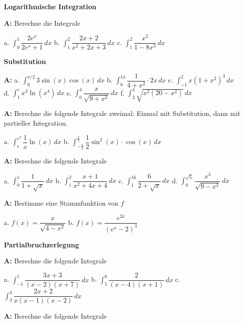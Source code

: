 \documentclass[landscape,twocolumn,a4paper]{article}
\begin{document}
\textbf{Logarithmische Integration} 
\bigskip

\textbf{A:}   
Berechne die Integrale 

a.  $\displaystyle\int_0^1 \dfrac{2e^x}{2e^x+1}  \, dx$ \quad
b.  $\displaystyle\int_1^2 \dfrac{2x+2}{x^2+2x+3} \, dx$ \quad
c.  $\displaystyle\int_1^2 \dfrac{x^2}{1-8x^3}  \, dx$ \quad
\bigskip  {}

\textbf{Substitution} 
\bigskip

\textbf{A:}   
a.  $\displaystyle\int_0^{\pi/2} 3\sin(x)\cos(x) \, dx$ \quad
b.  $\displaystyle\int_0^{14} \dfrac{1}{4+x^2}\cdot 2x \, dx$ \quad
c.  $\displaystyle\int_{-1}^2 x(1+x^2)^3  \, dx$   \\

d.  $\displaystyle\int_{1}^e x^3 \ln(x^4)  \, dx$ \quad
e.  $\displaystyle\int_0^4 \dfrac{x}{\sqrt{9+x^2}}  \, dx$ \quad
f.  $\displaystyle\int_2^4 \sqrt{x^2(20-x^2)}  \, dx$ \quad
\bigskip  {}

\textbf{A:}   
Berechne die folgende Integrale zweimal: Einmal mit Substitution, dann mit partieller Integration.

a.  $\displaystyle\int_e^{e^2} \dfrac{1}{x}\ln(x)\, dx$ \quad
b.  $\displaystyle\int_{-\frac{\pi}{2}}^{\frac{\pi}{2}} \dfrac{1}{2}\sin^2(x) \cdot \cos(x)\, dx$ \quad
\bigskip  {}

\newpage
\textbf{A:}   
Berechne die folgende Integrale 

a.  $\displaystyle\int_0^1 \dfrac{1}{1+\sqrt{x}}\, dx$ \quad
b.  $\displaystyle\int_1^2 \dfrac{x+1}{x^2+4x+4} \, dx$ \quad
c.  $\displaystyle\int_1^{16} \dfrac{6}{2+\sqrt{x}} \, dx$ \quad
d.  $\displaystyle\int_0^{\sqrt{5}} \dfrac{x^3}{\sqrt{9-x^2}} \, dx$ \quad
\bigskip  {}

\textbf{A:}   
Bestimme eine Stammfunktion von $f$

a.  $f(x) = \dfrac{x}{\sqrt{4-x^2}}$ \quad 
b.  $f(x) = \dfrac{e^{2x}}{(e^x-2)^3}$
\bigskip  {}

\textbf{Partialbruchzerlegung} 
\bigskip

\textbf{A:}   
Berechne die folgende Integrale

a.  $\displaystyle\int_{-1}^1 \dfrac{3x+3}{(x-2)(x+7)}\, dx$ \quad
b.  $\displaystyle\int_{5}^6 \dfrac{2}{(x-4)(x+1)}\, dx$ \quad
c.  $\displaystyle\int_{3}^4 \dfrac{2x+2}{x(x-1)(x-2)}\, dx$ \quad
\bigskip  {}

\textbf{A:}   
Berechne die folgende Integrale
\end{document}
